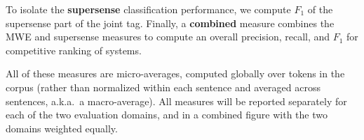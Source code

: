 \documentclass[11pt]{article}
\newcommand{\ensuretext}[1]{#1}
\newcommand{\nssmarker}{\ensuretext{\textcolor{magenta}{\ensuremath{^{\textsc{NS}}_{\textsc{S}}}}}}
\newcommand{\arkcomment}[3]{\ensuretext{\textcolor{#3}{[#1 #2]}}}
\newcommand{\nss}[1]{\arkcomment{\nssmarker}{#1}{magenta}}
\newcommand{\longversion}[1]{} %
\begin{document}
To isolate the \textbf{supersense} classification performance, 
we compute $F_1$ of the supersense part of the joint tag.\longversion{
Because the supersense of a strong MWE is marked on its first word, 
this will have the effect of penalizing errors on the left boundary of an MWE, 
but it is less sensitive to the MWE analysis than the link-based measure. 

The third measure is a hybrid of the first two: it computes \textbf{overall} performance 
in terms of link-based $F_1$, where for each supersense label, 
a self-link encoding that label is added to the first word of the expression.
Credit is only given for a self-link if in the other analysis, 
a corresponding self-link occurs with the same supersense.\nss{short:}}
Finally, a \textbf{combined} measure combines the MWE and supersense measures 
to compute an overall precision, recall, and $F_1$
for competitive ranking of systems.

All of these measures are micro-averages, computed globally over tokens in the corpus 
(rather than normalized within each sentence and averaged across sentences, a.k.a.~a macro-average).
All measures will be reported separately for each of the two evaluation domains, 
and in a combined figure with the two domains weighted equally. 


\end{document}
